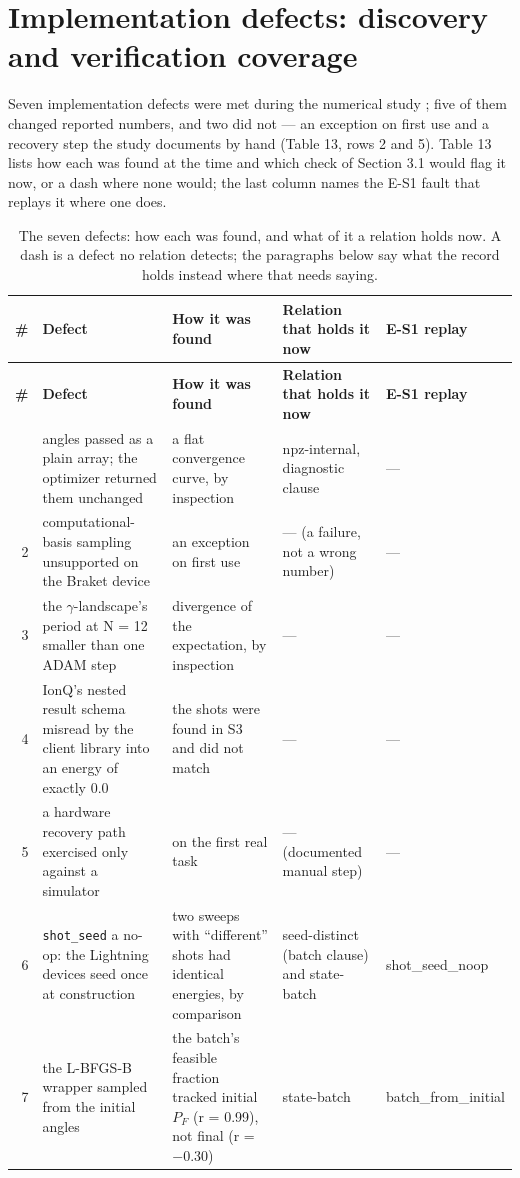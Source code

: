 \documentclass[acmsmall,screen,review]{acmart}
\begin{document}
\section{Implementation defects: discovery and verification coverage}

Seven implementation defects were met during the numerical study \cite[Sec. VI-C and Supplementary S-IX]{ref1}; five of them changed reported numbers, and two did not --- an exception on first use and a recovery step the study documents by hand (Table 13, rows 2 and 5). Table 13 lists how each was found at the time and which check of Section 3.1 would flag it now, or a dash where none would; the last column names the E-S1 fault that replays it where one does.



\begingroup
\small
\setlength\LTleft{\fill}
\setlength\LTright{\fill}
\begin{xltabular}{\textwidth}{r>{\hsize}Y>{\hsize}Y>{\hsize}Y>{\hsize}Y}
\caption{The seven defects: how each was found, and what of it a relation holds now. A dash is a defect no relation detects; the paragraphs below say what the record holds instead where that needs saying.}\label{tab:13} \\
\toprule
\textbf{\#} & \textbf{Defect} & \textbf{How it was found} & \textbf{Relation that holds it now} & \textbf{E-S1 replay} \\
\midrule
\endfirsthead
\toprule
\textbf{\#} & \textbf{Defect} & \textbf{How it was found} & \textbf{Relation that holds it now} & \textbf{E-S1 replay} \\
\midrule
\endhead
\endfoot
\bottomrule
{} & angles passed as a plain array; the optimizer returned them unchanged & a flat convergence curve, by inspection & npz-internal, diagnostic clause & --- \\
2 & computational-basis sampling unsupported on the Braket device & an exception on first use & --- (a failure, not a wrong number) & --- \\
3 & the $\gamma$-landscape's period at N = 12 smaller than one ADAM step & divergence of the expectation, by inspection & --- & --- \\
4 & IonQ's nested result schema misread by the client library into an energy of exactly 0.0 & the shots were found in S3 and did not match & --- & --- \\
5 & a hardware recovery path exercised only against a simulator & on the first real task & --- (documented manual step) & --- \\
6 & \texttt{shot\_seed} a no-op: the Lightning devices seed once at construction & two sweeps with ``different'' shots had identical energies, by comparison & seed-distinct (batch clause) and state-batch & shot\_seed\_noop \\
7 & the L-BFGS-B wrapper sampled from the initial angles & the batch's feasible fraction tracked initial $P_{F}$ (r = 0.99), not final (r = $-$0.30) & state-batch & batch\_from\_initial \\
\end{xltabular}
\endgroup
\end{document}
